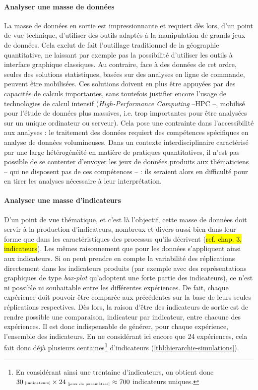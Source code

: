	\paragraph*{Analyser une masse de données}
	La masse de données en sortie est impressionnante et requiert dès lors, d'un point de vue technique, d'utiliser des outils adaptés à la manipulation de grands jeux de données.
	Cela exclut de fait l'outillage traditionnel de la géographie quantitative, ne laissant par exemple pas la possibilité d'utiliser les outils à interface graphique classiques.
	Au contraire, face à des données de cet ordre, seules des solutions statistiques, basées sur des analyses en ligne de commande, peuvent être mobilisées.
	Ces solutions doivent en plus être appuyées par des capacités de calculs importantes, sans toutefois justifier encore l'usage de technologies de calcul intensif (\og \textit{High-Performance Computing}\fg{} --HPC --, mobilisé pour l'étude de données plus massives, i.e. trop importantes pour être analysées sur un unique ordinateur ou serveur).
	Cela pose une contrainte dans l'accessibilité aux analyses : le traitement des données requiert des compétences spécifiques en analyse de données volumineuses.
	Dans un contexte interdisciplinaire caractérisé par une large hétérogénéité en matière de pratiques quantitatives, il n'est pas possible de se contenter d'envoyer les jeux de données produits aux thématiciens -- qui ne disposent pas de ces compétences -- : ils seraient alors en difficulté pour en tirer les analyses nécessaire à leur interprétation.

	\paragraph*{Analyser une masse d'indicateurs}
	D'un point de vue thématique, et c'est là l'objectif, cette masse de données doit servir à la production d'indicateurs, nombreux et divers aussi bien dans leur forme que dans les caractéristiques des processus qu'ils décrivent (\hl{ref. chap. 3, indicateurs}).
	Les mêmes raisonnement que pour les données s'appliquent ainsi aux indicateurs.
	Si on peut prendre en compte la variabilité des réplications directement dans les indicateurs produits (par exemple avec des représentations graphiques de type \textit{box-plot} qu'adoptent une forte partie des indicateurs), ce n'est ni possible ni souhaitable entre les différentes expériences.
	De fait, chaque expérience doit pouvoir être comparée aux précédentes sur la base de leurs seules réplications respectives.
	Dès lors, la raison d'être des indicateurs de sortie est de rendre possible une comparaison, indicateur par indicateur, entre chacune des expériences.
	Il est donc indispensable de générer, pour chaque expérience, l'ensemble des indicateurs. En ne considérant ici encore que 24 expériences, cela fait donc déjà plusieurs centaines\footnote{
	En considérant ainsi une trentaine d'indicateurs, on obtient donc $30{\text{\tiny ~[indicateurs]}} \times 24_{\text{\tiny ~[jeux de paramètres]}} \approx 700$ indicateurs uniques.
	} d'indicateurs (\cref{tbl:hierarchie-simulations}).

